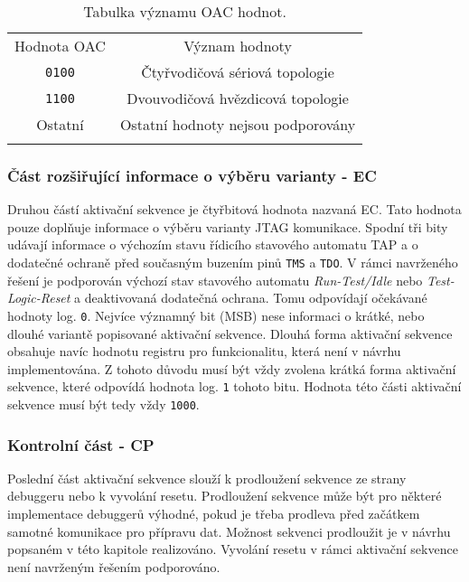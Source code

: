 \begin{table}[!h]
  \caption{Tabulka významu OAC hodnot. \cite{IEEE_1149-7}}
  \begin{center}
  	\small
	  \begin{tabular}{!{\vrule width 1.2pt}c|c!{\vrule width 1.2pt}}
	    Hodnota \acs{OAC} & Význam hodnoty\\
			\texttt{0100} & Čtyřvodičová sériová topologie\\
			\hline
			\texttt{1100} & Dvouvodičová hvězdicová topologie\\
			\hline
			Ostatní & Ostatní hodnoty nejsou podporovány\\
			\hline
		\end{tabular}
  \end{center}
	\label{tab:oac}
\end{table}

\subsubsection{Část rozšiřující informace o výběru varianty - \acs{EC}}
Druhou částí aktivační sekvence je čtyřbitová hodnota nazvaná \acl{EC}. Tato hodnota pouze doplňuje informace o výběru varianty \acs{JTAG} komunikace. Spodní tři bity udávají informace o výchozím stavu řídicího stavového automatu \acs{TAP} a o dodatečné ochraně před současným buzením pinů \texttt{\acs{TMS}} a \texttt{\acs{TDO}}. V rámci navrženého řešení je podporován výchozí stav stavového automatu \textit{Run-Test/Idle} nebo \textit{Test-Logic-Reset} a deaktivovaná dodatečná ochrana. Tomu odpovídají očekávané hodnoty log. \texttt{0}. Nejvíce významný bit (\acs{MSB}) nese informaci o krátké, nebo dlouhé variantě popisované aktivační sekvence. Dlouhá forma aktivační sekvence obsahuje navíc hodnotu registru pro funkcionalitu, která není v návrhu implementována. Z tohoto důvodu musí být vždy zvolena krátká forma aktivační sekvence, které odpovídá hodnota log. \texttt{1} tohoto bitu. Hodnota této části aktivační sekvence musí být tedy vždy \texttt{1000}. \cite{IEEE_1149-7}

\subsubsection{Kontrolní část - \acs{CP}}
Poslední část aktivační sekvence slouží k prodloužení sekvence ze strany debuggeru nebo k vyvolání resetu. Prodloužení sekvence může být pro některé implementace debuggerů výhodné, pokud je třeba prodleva před začátkem samotné komunikace pro přípravu dat. Možnost sekvenci prodloužit je v návrhu popsaném v této kapitole realizováno. Vyvolání resetu v rámci aktivační sekvence není navrženým řešením podporováno. \cite{IEEE_1149-7}

